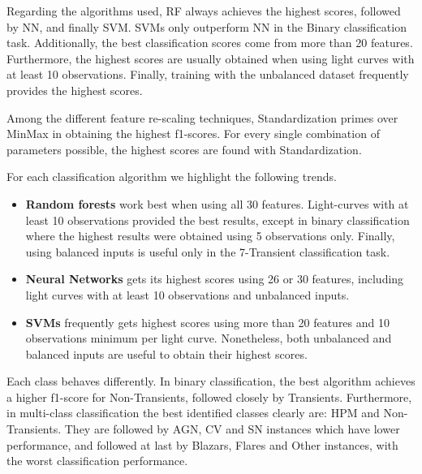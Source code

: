 \documentclass[a4paper,fleqn,usenatbib]{mnras}
\begin{document}
Regarding the algorithms used, RF always achieves the highest scores,
followed by NN,  and finally SVM. 
SVMs only outperform NN  in the Binary classification task. 
Additionally,  the best classification scores come from more than 20
features. 
Furthermore, the highest scores are usually obtained when using light
curves with at least 10 observations. 
Finally, training with the unbalanced dataset frequently provides the
highest scores.  

Among the different feature re-scaling techniques, Standardization
primes over MinMax in obtaining the highest f1-scores. 
For every single combination of parameters possible, the highest
scores are found with Standardization. 


For each classification algorithm we highlight the following trends.

\begin{itemize}
    \item \textbf{Random forests} work best when using all 30
      features. Light-curves with at least 10 observations provided the best
      results, except in binary classification where the highest
      results were obtained using 5 observations only. Finally, using
      balanced inputs is useful only in the 7-Transient
      classification task.  
    \item \textbf{Neural Networks} gets its highest scores using
      26 or 30 features, including light curves with at least 10 observations and
      unbalanced inputs. 
    \item \textbf{SVMs} frequently gets highest scores 
      using more than 20 features and 10 observations minimum per
      light curve. Nonetheless, both unbalanced and balanced inputs
      are useful to obtain their highest scores. 
\end{itemize}

Each class behaves differently. 
In binary classification,
the best algorithm achieves a higher f1-score for Non-Transients,
followed closely by Transients. 
Furthermore, in multi-class
classification the best identified classes clearly are: HPM and
Non-Transients. They are followed by AGN, CV and SN instances which
have lower performance, and followed at last by Blazars, Flares and
Other instances, with the worst classification performance.  

\end{document}
